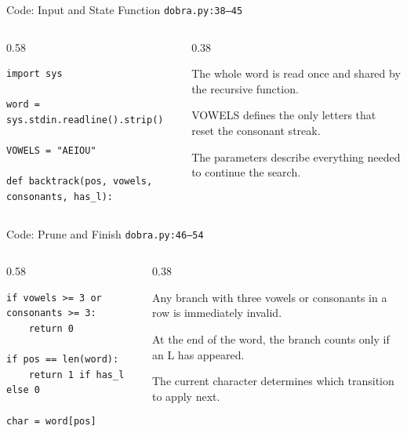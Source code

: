 \documentclass[aspectratio=169,11pt]{beamer}
\begin{document}
\begin{frame}[fragile]{Code: Input and State Function}
\scriptsize
{} \texttt{dobra.py:38--45}

\vspace{0.08cm}
\begin{columns}[T,totalwidth=\textwidth]
\begin{column}{0.58\textwidth}
\begin{lstlisting}[style=cpcode]
import sys

word = sys.stdin.readline().strip()

VOWELS = "AEIOU"

def backtrack(pos, vowels, consonants, has_l):
\end{lstlisting}
\end{column}
\begin{column}{0.38\textwidth}
\begin{tightitemize}
  \item The whole word is read once and shared by the recursive function.
  \item VOWELS defines the only letters that reset the consonant streak.
  \item The parameters describe everything needed to continue the search.
\end{tightitemize}
\end{column}
\end{columns}
\end{frame}

\begin{frame}[fragile]{Code: Prune and Finish}
\scriptsize
{} \texttt{dobra.py:46--54}

\vspace{0.08cm}
\begin{columns}[T,totalwidth=\textwidth]
\begin{column}{0.58\textwidth}
\begin{lstlisting}[style=cpcode]
if vowels >= 3 or consonants >= 3:
    return 0

if pos == len(word):
    return 1 if has_l else 0

char = word[pos]
\end{lstlisting}
\end{column}
\begin{column}{0.38\textwidth}
\begin{tightitemize}
  \item Any branch with three vowels or consonants in a row is immediately invalid.
  \item At the end of the word, the branch counts only if an L has appeared.
  \item The current character determines which transition to apply next.
\end{tightitemize}
\end{column}
\end{columns}
\end{frame}
\end{document}
